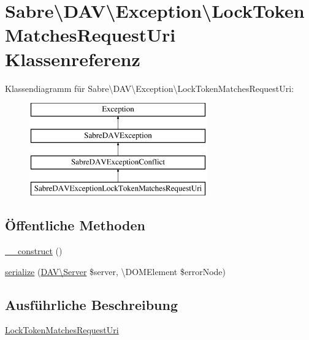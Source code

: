 \hypertarget{class_sabre_1_1_d_a_v_1_1_exception_1_1_lock_token_matches_request_uri}{}\section{Sabre\textbackslash{}D\+AV\textbackslash{}Exception\textbackslash{}Lock\+Token\+Matches\+Request\+Uri Klassenreferenz}
\label{class_sabre_1_1_d_a_v_1_1_exception_1_1_lock_token_matches_request_uri}
Klassendiagramm für Sabre\textbackslash{}D\+AV\textbackslash{}Exception\textbackslash{}Lock\+Token\+Matches\+Request\+Uri\+:\begin{figure}[H]
\begin{center}
\leavevmode
\includegraphics[height=4.000000cm]{class_sabre_1_1_d_a_v_1_1_exception_1_1_lock_token_matches_request_uri}
\end{center}
\end{figure}
\subsection*{Öffentliche Methoden}
\begin{DoxyCompactItemize}
\item 
\mbox{\hyperlink{class_sabre_1_1_d_a_v_1_1_exception_1_1_lock_token_matches_request_uri_a0931434ef8c854d3757cae9de32abfdf}{\+\_\+\+\_\+construct}} ()
\item 
\mbox{\hyperlink{class_sabre_1_1_d_a_v_1_1_exception_1_1_lock_token_matches_request_uri_a73800cb52a61d6284cec5e0123530056}{serialize}} (\mbox{\hyperlink{class_sabre_1_1_d_a_v_1_1_server}{D\+A\+V\textbackslash{}\+Server}} \$server, \textbackslash{}D\+O\+M\+Element \$error\+Node)
\end{DoxyCompactItemize}


\subsection{Ausführliche Beschreibung}
\mbox{\hyperlink{class_sabre_1_1_d_a_v_1_1_exception_1_1_lock_token_matches_request_uri}{Lock\+Token\+Matches\+Request\+Uri}}

